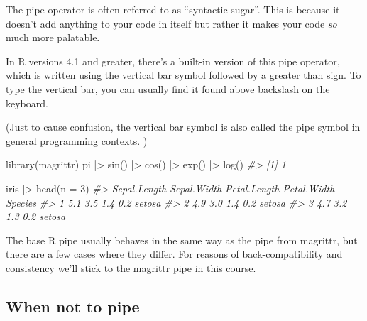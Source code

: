 \documentclass[
  12pt,
]{book}
\newenvironment{Shaded}{\begin{snugshade}}{\end{snugshade}}
\newcommand{\AttributeTok}[1]{\textcolor[rgb]{0.77,0.63,0.00}{#1}}
\newcommand{\CommentTok}[1]{\textcolor[rgb]{0.56,0.35,0.01}{\textit{#1}}}
\newcommand{\DecValTok}[1]{\textcolor[rgb]{0.00,0.00,0.81}{#1}}
\newcommand{\FunctionTok}[1]{\textcolor[rgb]{0.00,0.00,0.00}{#1}}
\newcommand{\NormalTok}[1]{#1}
\newcommand{\SpecialCharTok}[1]{\textcolor[rgb]{0.00,0.00,0.00}{#1}}
\begin{document}
The pipe operator is often referred to as ``syntactic sugar''. This is because it doesn't add anything to your code in itself but rather it makes your code \emph{so} much more palatable.

In R versions 4.1 and greater, there's a built-in version of this pipe operator, which is written using the vertical bar symbol followed by a greater than sign. To type the vertical bar, you can usually find it found above backslash on the keyboard.

(Just to cause confusion, the vertical bar symbol is also called the pipe symbol in general programming contexts. )

\begin{Shaded}
\begin{Highlighting}[]
\FunctionTok{library}\NormalTok{(magrittr)}
\NormalTok{pi }\SpecialCharTok{|\textgreater{}} 
  \FunctionTok{sin}\NormalTok{() }\SpecialCharTok{|\textgreater{}} 
  \FunctionTok{cos}\NormalTok{() }\SpecialCharTok{|\textgreater{}} 
  \FunctionTok{exp}\NormalTok{() }\SpecialCharTok{|\textgreater{}} 
  \FunctionTok{log}\NormalTok{()}
\CommentTok{\#\textgreater{} [1] 1}
\end{Highlighting}
\end{Shaded}

\begin{Shaded}
\begin{Highlighting}[]
\NormalTok{iris }\SpecialCharTok{|\textgreater{}} 
  \FunctionTok{head}\NormalTok{(}\AttributeTok{n =} \DecValTok{3}\NormalTok{)}
\CommentTok{\#\textgreater{}   Sepal.Length Sepal.Width Petal.Length Petal.Width Species}
\CommentTok{\#\textgreater{} 1          5.1         3.5          1.4         0.2  setosa}
\CommentTok{\#\textgreater{} 2          4.9         3.0          1.4         0.2  setosa}
\CommentTok{\#\textgreater{} 3          4.7         3.2          1.3         0.2  setosa}
\end{Highlighting}
\end{Shaded}

The base R pipe usually behaves in the same way as the pipe from magrittr, but there are a few cases where they differ. For reasons of back-compatibility and consistency we'll stick to the magrittr pipe in this course.

\hypertarget{when-not-to-pipe}{%
\subsection{When not to pipe}\label{when-not-to-pipe}}
\end{document}
